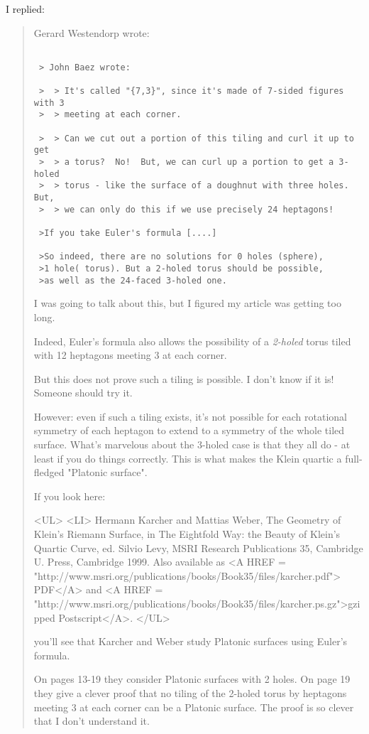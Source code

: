I replied:

\begin{quote}
Gerard Westendorp wrote:


\begin{verbatim}

 > John Baez wrote:

 >  > It's called "{7,3}", since it's made of 7-sided figures with 3
 >  > meeting at each corner.

 >  > Can we cut out a portion of this tiling and curl it up to get
 >  > a torus?  No!  But, we can curl up a portion to get a 3-holed
 >  > torus - like the surface of a doughnut with three holes.  But,
 >  > we can only do this if we use precisely 24 heptagons!

 >If you take Euler's formula [....]

 >So indeed, there are no solutions for 0 holes (sphere),
 >1 hole( torus). But a 2-holed torus should be possible,
 >as well as the 24-faced 3-holed one.
\end{verbatim}
    

I was going to talk about this, but I figured my article
was getting too long.  

Indeed, Euler's formula also allows the possibility of a 
\emph{2-holed} torus tiled with 12 heptagons meeting 3 at each corner.  

But this does not prove such a tiling is possible.  I don't know 
if it is!  Someone should try it.

However: even if such a tiling exists, it's not possible for each 
rotational symmetry of each heptagon to extend to a symmetry 
of the whole tiled surface.   What's marvelous about the 3-holed
case is that they all do - at least if you do things correctly.
This is what makes the Klein quartic a full-fledged "Platonic 
surface".

If you look here:

<UL>
<LI>
Hermann Karcher and Mattias Weber, The Geometry of Klein's Riemann Surface,
in The Eightfold Way: the Beauty of Klein's Quartic Curve, 
ed. Silvio Levy, MSRI Research Publications 35, Cambridge U. Press, 
Cambridge 1999. Also available as
<A HREF = "http://www.msri.org/publications/books/Book35/files/karcher.pdf">
PDF</A> and
<A HREF = 
"http://www.msri.org/publications/books/Book35/files/karcher.ps.gz">gzipped
Postscript</A>.
</UL>

you'll see that Karcher and Weber study Platonic surfaces using Euler's 
formula.

On pages 13-19 they consider Platonic surfaces with 2 holes.
On page 19 they give a clever proof that no tiling of the 2-holed torus 
by heptagons meeting 3 at each corner can be a Platonic surface. 
The proof is so clever that I don't understand it.


\end{quote}
